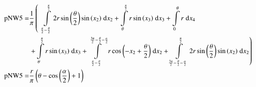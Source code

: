 \begin{align}
    \mathrm{pNW5} =&\frac{1}{\pi} \left(\;\;\int\limits_{\frac{\pi}{2} - \frac{\theta}{2}}^{\frac{\pi}{2}}2 r \sin{\left (\frac{\theta}{2} \right )} \sin{\left (x_{2} \right )}\;\mathrm{d}x_{2}+\int\limits_{\theta}^{\frac{\pi}{2}}r \sin{\left (x_{3} \right )}\;\mathrm{d}x_{3}+\int\limits_{0}^{\theta}r\;\mathrm{d}x_{4}\right.\notag\\
 &\left.+\int\limits_{\theta}^{\frac{\pi}{2}}r \sin{\left (x_{3} \right )}\;\mathrm{d}x_{3}+\int\limits_{\frac{\pi}{2} - \frac{\theta}{2}}^{\frac{3 \pi}{2} - \frac{\theta}{2} - \frac{\alpha}{2}}r \cos{\left (- x_{2} + \frac{\theta}{2} \right )}\;\mathrm{d}x_{2}+\int\limits_{\frac{3 \pi}{2} - \frac{\theta}{2} - \frac{\alpha}{2}}^{\frac{\pi}{2}}2 r \sin{\left (\frac{\theta}{2} \right )} \sin{\left (x_{2} \right )}\;\mathrm{d}x_{2}\right)\label{pNW5Def}\\
    \mathrm{pNW5} =& \frac{r}{\pi} \left(\theta - \cos{\left (\frac{\alpha}{2} \right )} + 1\right)\label{pNW5Sln}
\end{align}